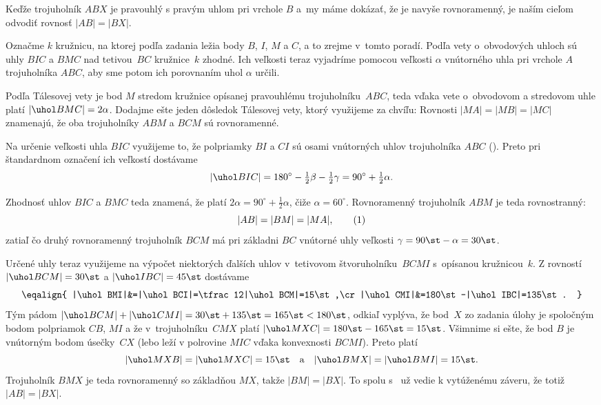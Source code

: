 {%
Keďže trojuholník $ABX$ je pravouhlý s pravým uhlom pri vrchole
$B$ a~my máme dokázať, že je navyše rovnoramenný, je naším cieľom
odvodiť rovnosť $|AB|=|BX|$.

Označme $k$ kružnicu, na ktorej podľa zadania ležia body $B$, $I$, $M$
a $C$, a to zrejme v~tomto poradí. Podľa vety o~obvodových uhloch
sú uhly $BIC$ a $BMC$ nad tetivou~$BC$ kružnice~$k$ zhodné.
Ich veľkosti teraz vyjadríme pomocou veľkosti $\alpha$ vnútorného
uhla pri vrchole $A$ trojuholníka $ABC$, aby sme potom ich porovnaním
uhol $\alpha$ určili.

Podľa Tálesovej vety je bod $M$ stredom kružnice opísanej
pravouhlému trojuholníku~$ABC$, teda vďaka vete o~obvodovom a stredovom uhle
platí $|\uhol BMC|=2\alpha$. Dodajme
ešte jeden dôsledok Tálesovej vety, ktorý využijeme za chvíľu:
Rovnosti $|MA|=|MB|=|MC|$ znamenajú, že oba trojuholníky $ABM$ a $BCM$
sú rovnoramenné.

Na určenie veľkosti uhla $BIC$ využijeme to, že polpriamky
$BI$ a $CI$ sú osami vnútorných uhlov trojuholníka $ABC$ (\obr). Preto pri
štandardnom označení ich veľkostí dostávame
$$
|\uhol BIC|=180^{\circ}-\tfrac12\beta-\tfrac12\gamma=
90^{\circ}+\tfrac12\alpha.
$$
%

Zhodnosť uhlov $BIC$ a $BMC$ teda znamená, že platí
$2\alpha=90^{\circ}+\frac12\alpha$, čiže
$\alpha=60^{\circ}$. Rovnoramenný trojuholník $ABM$ je teda
rovnostranný:
$$
|AB|=|BM|=|MA|,
\tag1$$
zatiaľ čo druhý rovnoramenný trojuholník $BCM$ má pri základni $BC$
vnútorné uhly veľkosti $\gamma=90\st-\alpha=30\st$.

Určené uhly teraz využijeme na výpočet niektorých ďalších
uhlov v~tetivovom štvoruholníku~$BCMI$ s~opísanou kružnicou~$k$.
Z rovností
$|\uhol BCM|=30\st$ a $|\uhol IBC|=45\st$ dostávame
$$\eqalign{
|\uhol BMI|&=|\uhol BCI|=\tfrac12|\uhol BCM|=15\st,\cr
|\uhol CMI|&=180\st-|\uhol IBC|=135\st.
}$$
Tým pádom $|\uhol BCM|+|\uhol CMI|=30\st+135\st=165\st<180\st$,
odkiaľ vyplýva, že bod~$X$ zo zadania úlohy je spoločným bodom
polpriamok $CB$, $MI$ a že v~trojuholníku~$CMX$
platí $|\uhol MXC|=180\st-165\st=15\st$.
Všimnime si ešte, že bod $B$ je vnútorným bodom úsečky~$CX$
(lebo leží v polrovine $MIC$ vďaka konvexnosti $BCMI$).
Preto platí
$$
|\uhol MXB|=|\uhol MXC|=15\st\quad\text{a}\quad
|\uhol BMX|=|\uhol BMI|=15\st.
$$
Trojuholník $BMX$ je teda rovnoramenný so základňou $MX$, takže
$|BM|=|BX|$. To spolu s~ už vedie k vytúženému záveru, že
totiž $|AB|=|BX|$.


}
